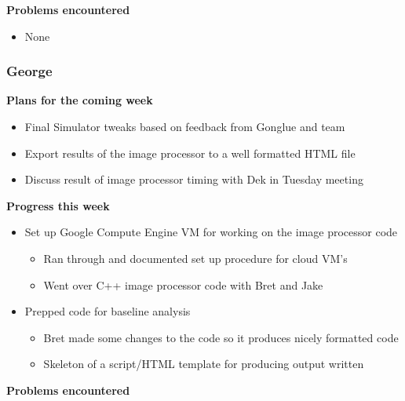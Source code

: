 \documentclass[10pt, onecolumn, draftclsnofoot, letterpaper, compsoc]{IEEEtran}
\begin{document}
    \noindent \textbf{Problems encountered}

    \begin{itemize}

    \item None

    \end{itemize}

    \subsubsection{George}

    \noindent \textbf{Plans for the coming week}

    \begin{itemize}

    \item Final Simulator tweaks based on feedback from Gonglue and team
    \item Export results of the image processor to a well formatted HTML file
    \item Discuss result of image processor timing with Dek in Tuesday meeting

    \end{itemize}

    \noindent \textbf{Progress this week}

    \begin{itemize}

    \item Set up Google Compute Engine VM for working on the image processor code
    \begin{itemize}
      \item Ran through and documented set up procedure for cloud VM's
      \item Went over C++ image processor code with Bret and Jake
    \end{itemize}

    \item Prepped code for baseline analysis
    \begin{itemize}
      \item Bret made some changes to the code so it produces nicely formatted code
      \item Skeleton of a script/HTML template for producing output written
    \end{itemize}

    \end{itemize}

    \noindent \textbf{Problems encountered}
\end{document}

